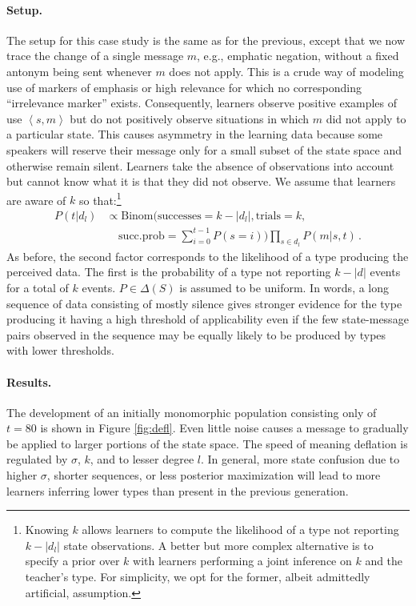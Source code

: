 \documentclass[10pt,a4paper]{article}
\newcommand{\tuple}[1]{\ensuremath{\left\langle #1 \right\rangle}}
\begin{document}
\paragraph{Setup.} The setup for this case study is the same as for the previous, except that
we now trace the change of a single message $m$, e.g., emphatic negation, without a fixed
antonym being sent whenever $m$ does not apply. This is a crude way of modeling use of
markers of emphasis or high relevance for which no corresponding ``irrelevance marker''
exists. Consequently, learners observe positive examples of use $\tuple{s,m}$ but do not
positively observe situations in which $m$ did not apply to a particular state. This causes
asymmetry in the learning data because some speakers will reserve their message only for a
small subset of the state space and otherwise remain silent. Learners take the absence of
observations into account but cannot know what it is that they did not observe. We assume that
learners are aware of $k$ so that:\footnote{Knowing $k$ allows learners to compute the
  likelihood of a type not reporting $k -|d_l|$ state observations. A better but more complex
  alternative is to specify a prior over $k$ with learners performing a joint inference on $k$
  and the teacher's type. For simplicity, we opt for the former, albeit admittedly artificial,
  assumption.}
\begin{align*}
  P(t | d_l) & \propto \text{Binom}(\text{successes} =
  k-|d_l|, \text{trials} = k, \\
  & 
  \ \ \ \ \ \text{succ.prob} = \sum_{i=0}^{t-1} P(s = i)) \prod_{s \in d_l} P(m|s,t)\,.
\end{align*}
As before, the second factor corresponds to the
likelihood of a type producing the perceived data.  The first is the probability of a type not
reporting $k-|d|$ events for a total of $k$ events. $P \in \Delta(S)$ is assumed to be
uniform. In words, a long sequence of data consisting of mostly silence gives stronger evidence
for the type producing it having a high threshold of applicability even if the few state-message pairs observed in
the sequence may be equally likely to be produced by types with lower thresholds.

\paragraph{Results.} The development of an initially monomorphic population consisting only of
$t = 80$ is shown in Figure \ref{fig:defl}. Even little noise causes a message to gradually be
applied to larger portions of the state space. The speed of meaning deflation is regulated by
$\sigma$, $k$, and to lesser degree $l$. In general, more state confusion due to higher
$\sigma$, shorter sequences, or less posterior maximization will lead to more learners
inferring lower types than present in the previous generation.
\end{document}
